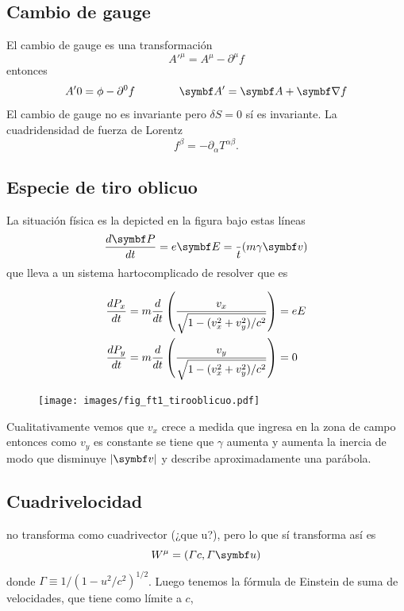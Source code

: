 \documentclass[10pt,oneside]{CBFT_book}
\begin{document}
\subsection{Cambio de gauge}

El cambio de gauge es una transformación 
\[
	A'^\mu = A^\mu - \partial^\mu f
\]
entonces 
\[
	A'0 = \phi - \partial^0 f \qquad \qquad \vb{A}' = \vb{A} + \Nabla f
\]
El cambio de gauge no es invariante pero $\delta S = 0$ sí es invariante.
La cuadridensidad de fuerza de Lorentz 
\[
	f^\beta = - \partial_\alpha T^{\alpha\beta}.
\]

\subsection{Especie de tiro oblicuo}

La situación física es la depicted en la figura bajo estas líneas
\[
	\dtot{\vb{P}}{t} = e\vb{E} = \frac{}{t}( m \gamma \vb{v} )
\]
que lleva a un sistema hartocomplicado de resolver que es 

\begin{align*}
 \frac{d^{\hspace{-0.05em}} {P_x}}{d {t}^{\hspace{-0.05em}}} &= m \frac{d^{\hspace{-0.05em}} {}}{d {t}^{\hspace{-0.05em}}}\left( \frac{v_x}{ \sqrt{ 1 - (v_x^2 + v_y^2)/c^2 } }\right) = eE \\
 \frac{d^{\hspace{-0.05em}} {P_y}}{d {t}^{\hspace{-0.05em}}} &= m \frac{d^{\hspace{-0.05em}} {}}{d {t}^{\hspace{-0.05em}}}\left( \frac{v_y}{ \sqrt{ 1 - (v_x^2 + v_y^2)/c^2 } }\right) =0 \\
\end{align*}


\begin{figure}[htb]
	\begin{center}
	\texttt{[image: images/fig\_ft1\_tirooblicuo.pdf]}	 
	\end{center}
	\caption{}
\end{figure} 

Cualitativamente vemos que $v_x$ crece a medida que ingresa en la zona de campo  entonces como $v_y$ es
constante se tiene que $\gamma$ aumenta y aumenta la inercia de modo que disminuye $|\vb{v}|$ y describe
aproximadamente una parábola.

\subsection{Cuadrivelocidad}

 no transforma como cuadrivector (¿que u?), pero lo que sí transforma así es
\[
	W^\mu = ( \Gamma c , \Gamma \vb{u} ) 
\]
donde $ \Gamma \equiv 1/( 1 - u^2/c^2)^{1/2}$. Luego tenemos la fórmula de Einstein de suma de velocidades,
que tiene como límite a $c$,
\end{document}
